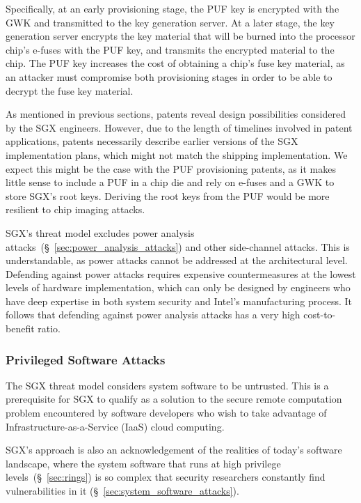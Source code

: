Specifically, at an early provisioning stage, the PUF key is encrypted with the
GWK and transmitted to the key generation server. At a later stage, the key
generation server encrypts the key material that will be burned into the
processor chip's e-fuses with the PUF key, and transmits the encrypted material
to the chip. The PUF key increases the cost of obtaining a chip's fuse key
material, as an attacker must compromise both provisioning stages in order to
be able to decrypt the fuse key material.

As mentioned in previous sections, patents reveal design possibilities
considered by the SGX engineers. However, due to the length of timelines involved
in patent applications, patents necessarily describe earlier versions of the
SGX implementation plans, which might not match the shipping implementation. We
expect this might be the case with the PUF provisioning patents, as it makes
little sense to include a PUF in a chip die and rely on e-fuses and a GWK to
store SGX's root keys. Deriving the root keys from the PUF would be more
resilient to chip imaging attacks.

SGX's threat model excludes power analysis
attacks~(\S~\ref{sec:power_analysis_attacks}) and other side-channel attacks.
This is understandable, as power attacks cannot be addressed at the
architectural level. Defending against power attacks requires expensive
countermeasures at the lowest levels of hardware implementation, which can only
be designed by engineers who have deep expertise in both system security and
Intel's manufacturing process. It follows that defending against power analysis
attacks has a very high cost-to-benefit ratio.


\subsubsection{Privileged Software Attacks}
\label{sec:sgx_vs_privileged_sw_attacks}

The SGX threat model considers system software to be untrusted. This is a
prerequisite for SGX to qualify as a solution to the secure remote computation
problem encountered by software developers who wish to take advantage of
Infrastructure-as-a-Service (IaaS) cloud computing.

SGX's approach is also an acknowledgement of the realities of today's software
landscape, where the system software that runs at high privilege
levels~(\S~\ref{sec:rings}) is so complex that security researchers constantly
find vulnerabilities in it (\S~\ref{sec:system_software_attacks}).

